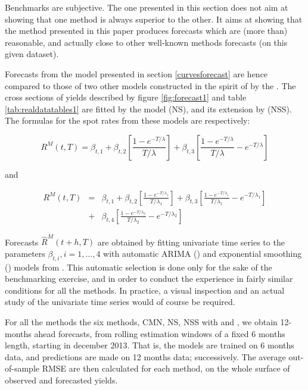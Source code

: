 Benchmarks are subjective. The one presented in this section does not aim at showing that one method is always superior to the other. It aims at showing that the method presented in this paper produces forecasts which are (more than) reasonable, and actually close to other well-known methods forecasts (on this given dataset).

\medskip

Forecasts from the model presented in section \ref{curvesforecast} are hence compared to those of two other models constructed in the spirit of by the \cite{diebold2006forecasting}. The cross sections of yields described by figure \ref{fig:forecast1} and table \ref{tab:realdatatables1} are fitted by the \cite{nelson1987parsimonious} model (NS), and its extension by \cite{svensson1994estimating} (NSS). The formulas for the spot rates from these models are respectively:

\begin{equation}
\label{NSyield}
R^M(t, T) = \beta_{t, 1} + \beta_{t, 2} \left[ \frac{1 - e^{-T/\lambda}}{T/\lambda}\right] + \beta_{t, 3} \left[ \frac{1 - e^{-T/\lambda}}{T/\lambda} - e^{-T/\lambda} \right]
\end{equation}

and

\begin{eqnarray}
R^M(t, T) &=& \beta_{t, 1} + \beta_{t, 2} \left[ \frac{1 - e^{-T/\lambda_1}}{T/\lambda_1}\right] + \beta_{t, 3} \left[ \frac{1 - e^{-T/\lambda_1}}{T/\lambda_1} - e^{-T/\lambda_1} \right] \\
&+&\beta_{t, 4} \left[ \frac{1 - e^{-T/\lambda_2}}{T/\lambda_2} - e^{-T/\lambda_2} \right]
\end{eqnarray}

Forecasts $\hat{R}^M(t+h, T)$ are obtained by fitting univariate time series to the parameters $\beta_{t, i}, i = 1, \ldots, 4$ with automatic ARIMA () and exponential smoothing () models from \cite{hyndman2008automatic}. This automatic selection is done only for the sake of the benchmarking exercise, and in order to conduct the experience in fairly similar conditions for all the methods. In practice, a visual inspection and an actual study of the univariate time series would of course be required.

\medskip

For all the methods the six methods, CMN, NS, NSS with  and , we obtain 12-months ahead forecasts, from rolling estimation windows of a fixed 6 months length, starting in december 2013. That is, the models are trained on 6 months data, and predictions are made on 12 months data; successively. The average out-of-sample RMSE are then calculated for each method, on the whole surface of observed and forecasted yields.

